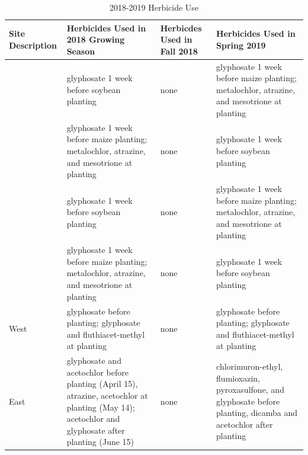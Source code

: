 \documentclass[]{article}
\begin{document}
\newpage

\begin{table}[H]

\caption{\label{tab:herbtable}2018-2019 Herbicide Use}
\centering
\begin{tabular}[t]{>{\centering\arraybackslash}p{8em}>{\centering\arraybackslash}p{8em}>{\centering\arraybackslash}p{8em}>{\centering\arraybackslash}p{8em}}
\toprule
Site Description & Herbicides Used in 2018 Growing Season & Herbicdes Used in Fall 2018 & Herbicides Used in Spring 2019\\
\midrule
\rowcolor{gray!6}   & glyphosate 1 week before soybean planting & none & glyphosate 1 week before maize planting; metalochlor, atrazine, and mesotrione at planting\\

\multirow{-2}{8em}{\centering\arraybackslash Central Grain} & glyphosate 1 week before maize planting; metalochlor, atrazine, and mesotrione at planting & none & glyphosate 1 week before soybean planting\\
\cmidrule{1-4}
\rowcolor{gray!6}   & glyphosate 1 week before soybean planting & none & glyphosate 1 week before maize planting; metalochlor, atrazine, and mesotrione at planting\\

\multirow{-2}{8em}{\centering\arraybackslash Central Silage} & glyphosate 1 week before maize planting; metalochlor, atrazine, and mesotrione at planting & none & glyphosate 1 week before soybean planting\\
\cmidrule{1-4}
\rowcolor{gray!6}  West & glyphosate before planting; glyphosate and fluthiacet-methyl at planting & none & glyphosate before planting; glyphosate and fluthiacet-methyl at planting\\
\cmidrule{1-4}
East & glyphosate and acetochlor  before planting (April 15), atrazine, acetochlor at planting (May 14); acetochlor and glyphosate after planting (June 15) & none & chlorimuron-ethyl, flumioxazin, pyroxasulfone, and glyphosate before planting, dicamba and acetochlor after planting\\
\bottomrule
\end{tabular}
\end{table}

\newpage
\end{document}
